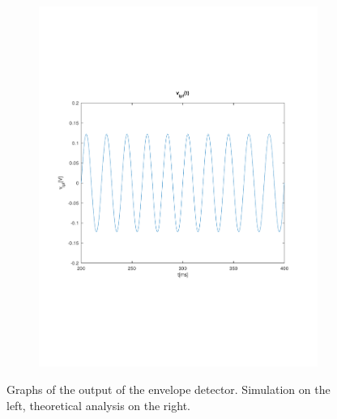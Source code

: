 \begin{figure}[h]
\begin{subfigure}{0.23\textwidth}
        \includegraphics[width=1.5\linewidth, clip]{../mat/vo.pdf}
        \label{fig:PSciclo}
    \end{subfigure}

    \caption{\small Graphs of the output of the envelope detector. Simulation on the left, theoretical analysis on the right.}
    \label{maquina}
\end{figure}

